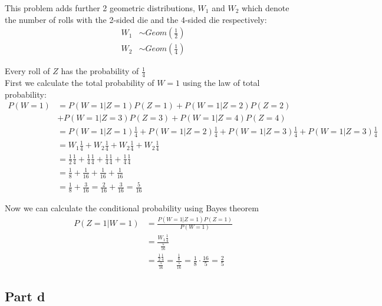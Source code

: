 This problem adds further 2 geometric distributions, $W_1$ and $W_2$ which denote the number of rolls with the 2-sided die and the 4-sided die respectively:
\begin{align*}
	W_1 & \sim Geom\left(\frac{1}{2}\right) \\
	W_2 & \sim Geom\left(\frac{1}{4}\right)
\end{align*}

Every roll of $Z$ has the probability of $\frac{1}{4}$\\

First we calculate the total probability of $W=1$ using the law of total probability:
\begin{align*}
	P(W=1) & = P(W=1|Z=1)P(Z=1) + P(W=1|Z=2)P(Z=2)                                                               \\
	       & + P(W=1|Z=3)P(Z=3) + P(W=1|Z=4)P(Z=4)                                                               \\
	       & = P(W=1|Z=1)\frac{1}{4} + P(W=1|Z=2)\frac{1}{4} + P(W=1|Z=3)\frac{1}{4} + P(W=1|Z=3)\frac{1}{4}     \\
	       & = W_1\frac{1}{4} + W_2\frac{1}{4} + W_2\frac{1}{4} + W_2\frac{1}{4}                                 \\
	       & = \frac{1}{2}\frac{1}{4} + \frac{1}{4}\frac{1}{4} + \frac{1}{4}\frac{1}{4} + \frac{1}{4}\frac{1}{4} \\
	       & = \frac{1}{8} + \frac{1}{16} + \frac{1}{16} + \frac{1}{16}                                          \\
	       & = \frac{1}{8} + \frac{3}{16} = \frac{2}{16} + \frac{3}{16} = \frac{5}{16}
\end{align*}

Now we can calculate the conditional probability using Bayes theorem
\begin{align*}
	P(Z=1|W=1) & = \frac{P(W=1|Z=1)P(Z=1)}{P(W=1)}                                                                                             \\
	           & = \frac{W_1\frac{1}{4}}{\frac{5}{16}}                                                                                         \\
	           & = \frac{\frac{1}{2}\frac{1}{4}}{\frac{5}{16}} = \frac{\frac{1}{8}}{\frac{5}{16}} = \frac{1}{8}\cdot\frac{16}{5} = \frac{2}{5}
\end{align*}

\subsection{Part d}

